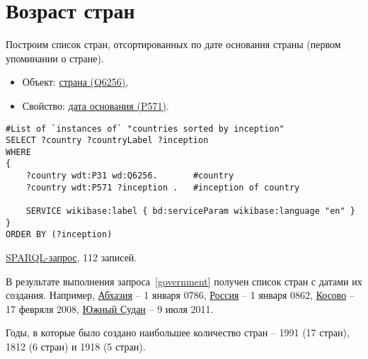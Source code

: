 \section{Возраст стран}

Построим список стран, отсортированных по дате основания страны (первом упоминании о стране).

\begin{itemize}
    \item Объект: \href{https://www.wikidata.org/wiki/Q6256}{страна (Q6256)},
    \item Свойство: \href{https://www.wikidata.org/wiki/Property:P571}{дата основания (P571)}.
\end{itemize}

\begin{lstlisting}[language=SPARQL label=countryinception, caption=Список стран упорядоченных по дате создания]
#List of `instances of` "countries sorted by inception" 
SELECT ?country ?countryLabel ?inception
WHERE
{
    ?country wdt:P31 wd:Q6256.       #country
    ?country wdt:P571 ?inception .   #inception of country
    
    SERVICE wikibase:label { bd:serviceParam wikibase:language "en" }
}
ORDER BY (?inception)
\end{lstlisting}


\href{https://query.wikidata.org/#%23List%20of%20%60instances%20of%60%20%22countries%20sorted%20by%20inception%22%20%0ASELECT%20%3Fcountry%20%3FcountryLabel%20%3Finception%0AWHERE%0A%7B%0A%20%20%20%20%3Fcountry%20wdt%3AP31%20wd%3AQ6256.%0A%20%20%20%20%3Fcountry%20wdt%3AP571%20%3Finception%20.%0A%20%20%20%20%0A%20%20%20%20SERVICE%20wikibase%3Alabel%20%7B%20bd%3AserviceParam%20wikibase%3Alanguage%20%22en%22%20%7D%0A%7D%0A%0AORDER%20BY%20%28%3Finception%29}{SPARQL-запрос}, 112 записей.

В результате выполнения запроса~\ref{government} получен список стран с датами их создания. Например, \href{https://www.wikidata.org/wiki/Q23334}{Абхазия} -- 1 января 0786, \href{https://www.wikidata.org/wiki/Q159}{Россия} -- 1 января 0862, \href{https://www.wikidata.org/wiki/Q1246}{Косово} -- 17 февряля 2008, \href{https://www.wikidata.org/wiki/Q958}{Южный Судан} -- 9 июля 2011.

Годы, в которые было создано наибольшее количество стран -- 1991 (17 стран), 1812 (6 стран) и 1918 (5 стран). 